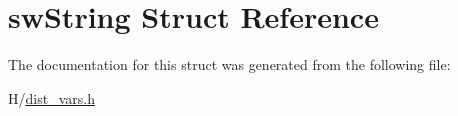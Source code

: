 \hypertarget{structswString}{
\section{swString Struct Reference}
\label{structswString}
}


The documentation for this struct was generated from the following file:\begin{DoxyCompactItemize}
\item 
H/\hyperlink{dist__vars_8h}{dist\_\-vars.h}\end{DoxyCompactItemize}
